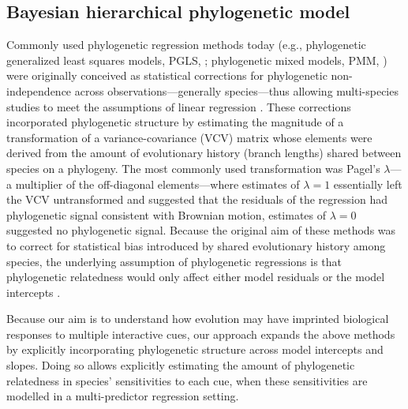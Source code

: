 \documentclass[11pt]{article}
\begin{document}
\subsection*{Bayesian hierarchical phylogenetic model}
Commonly used phylogenetic regression methods today (e.g., phylogenetic generalized least squares models, PGLS, \cite{freckleton2002phylogenetic}; phylogenetic mixed models, PMM, \cite{housworth2004phylogenetic}) were originally conceived as statistical corrections for phylogenetic non-independence across observations---generally species---thus allowing multi-species studies to meet the assumptions of linear regression \citep{freckleton2002phylogenetic}. These corrections incorporated phylogenetic structure by estimating the magnitude of a transformation of a variance-covariance (VCV) matrix whose elements were derived from the amount of evolutionary history (branch lengths) shared between species on a phylogeny. The most commonly used transformation was Pagel's $\lambda$---a multiplier of the off-diagonal elements---where estimates of $\lambda = 1$ essentially left the VCV untransformed and suggested that the residuals of the regression had phylogenetic signal consistent with Brownian motion, estimates of $\lambda = 0$ suggested no phylogenetic signal.%
Because the original aim of these methods was to correct for statistical bias introduced by shared evolutionary history among species, the underlying assumption of phylogenetic regressions is that phylogenetic relatedness would only affect either model residuals \citep[in PGLS approaches,][]{freckleton2002phylogenetic} or the model intercepts \citep[e.g., in many PMM approaches,][]{housworth2004phylogenetic}.

Because our aim is to understand how evolution may have imprinted biological responses to multiple interactive cues, our approach expands the above methods by explicitly incorporating phylogenetic structure across model intercepts and slopes. Doing so allows explicitly estimating the amount of phylogenetic relatedness in species' sensitivities to each cue, when these sensitivities are modelled in a multi-predictor regression setting.  
\end{document}
